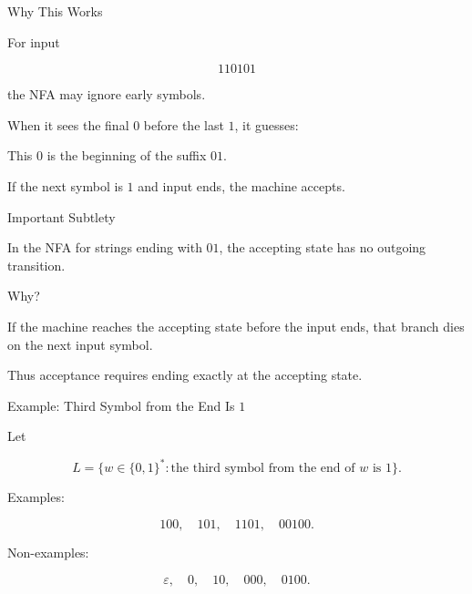 \documentclass[10pt,aspectratio=169]{beamer}
\newcommand{\eps}{\varepsilon}
\begin{document}
\begin{frame}{Why This Works}

For input

\[
110101
\]

the NFA may ignore early symbols.

\vspace{1em}

When it sees the final \(0\) before the last \(1\), it guesses:

\begin{center}
This \(0\) is the beginning of the suffix \(01\).
\end{center}

\vspace{1em}

If the next symbol is \(1\) and input ends, the machine accepts.

\end{frame}

\begin{frame}{Important Subtlety}

In the NFA for strings ending with \(01\), the accepting state has no outgoing transition.

\vspace{1em}

Why?

\pause

If the machine reaches the accepting state before the input ends, that branch dies on the next input symbol.

\vspace{1em}

Thus acceptance requires ending exactly at the accepting state.

\end{frame}

\begin{frame}{Example: Third Symbol from the End Is \(1\)}

Let

\[
L=\{w\in\{0,1\}^*: \text{the third symbol from the end of } w \text{ is }1\}.
\]

Examples:

\[
100,\quad 101,\quad 1101,\quad 00100.
\]

Non-examples:

\[
\eps,\quad 0,\quad 10,\quad 000,\quad 0100.
\]

\end{frame}
\end{document}
